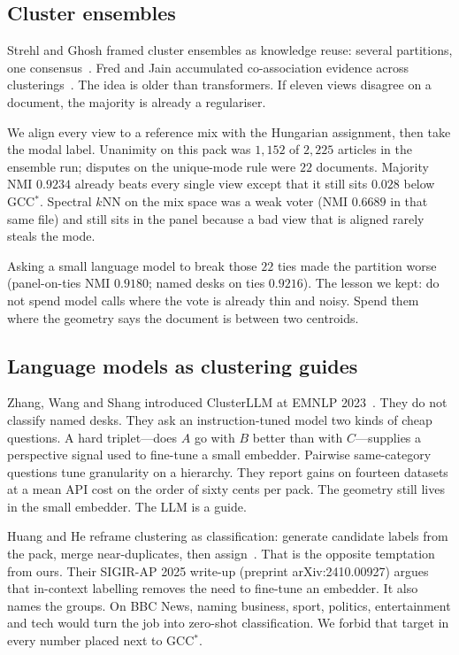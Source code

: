 \documentclass[11pt,a4paper]{article}
\begin{document}
\subsection{Cluster ensembles}

Strehl and Ghosh framed cluster ensembles as knowledge reuse:
several partitions, one consensus~\cite{strehl2002cluster}.
Fred and Jain accumulated co-association evidence across
clusterings~\cite{fred2005eac}. The idea is older than
transformers. If eleven views disagree on a document, the
majority is already a regulariser.

We align every view to a reference mix with the Hungarian
assignment, then take the modal label. Unanimity on this pack
was $1{,}152$ of $2{,}225$ articles in the ensemble run;
disputes on the unique-mode rule were $22$ documents. Majority
NMI $0.9234$ already beats every single view except that it
still sits $0.028$ below GCC$^*$. Spectral $k$NN on the mix
space was a weak voter (NMI $0.6689$ in that same file) and
still sits in the panel because a bad view that is aligned
rarely steals the mode.

Asking a small language model to break those $22$ ties made the
partition worse (panel-on-ties NMI $0.9180$; named desks on
ties $0.9216$). The lesson we kept: do not spend model calls
where the vote is already thin and noisy. Spend them where the
geometry says the document is between two centroids.

\subsection{Language models as clustering guides}

Zhang, Wang and Shang introduced ClusterLLM at EMNLP
2023~\cite{zhang2023clusterllm}. They do not classify named
desks. They ask an instruction-tuned model two kinds of cheap
questions. A hard triplet---does $A$ go with $B$ better than
with $C$---supplies a perspective signal used to fine-tune a
small embedder. Pairwise same-category questions tune
granularity on a hierarchy. They report gains on fourteen
datasets at a mean API cost on the order of sixty cents per
pack. The geometry still lives in the small embedder. The LLM
is a guide.

Huang and He reframe clustering as classification: generate
candidate labels from the pack, merge near-duplicates, then
assign~\cite{huang2024tcllc}. That is the opposite temptation
from ours. Their SIGIR-AP 2025 write-up (preprint
arXiv:2410.00927) argues that in-context labelling removes the
need to fine-tune an embedder. It also names the groups. On
BBC News, naming business, sport, politics, entertainment and
tech would turn the job into zero-shot classification. We
forbid that target in every number placed next to GCC$^*$.
\end{document}
